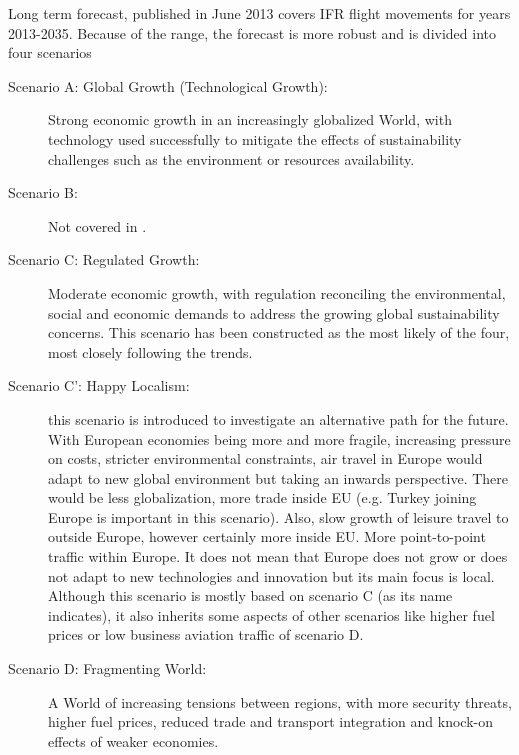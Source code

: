 Long term forecast, published in June 2013 covers IFR flight movements for years 2013-2035. Because of the range, the forecast is more robust and is divided into four scenarios \citep{growth_2013}

\begin{description}
\item[Scenario A: Global Growth (Technological Growth):] Strong economic growth in an increasingly globalized World, with technology used successfully to mitigate the effects of sustainability challenges such as the environment or resources availability.
\item[Scenario B:] Not covered in \citep{growth_2013}.
\item[Scenario C: Regulated Growth:] Moderate economic growth, with regulation reconciling the environmental, social and economic demands to address the growing global sustainability concerns. This scenario has been constructed as the most likely of the four, most closely following the trends.
\item[Scenario C’: Happy Localism:] this scenario is introduced to investigate an alternative path for the future. With European economies being more and more fragile, increasing pressure on costs, stricter environmental constraints, air travel in Europe would adapt to new global environment but taking an inwards perspective. There would be less globalization, more trade inside EU (e.g. Turkey joining Europe is important in this scenario). Also, slow growth of leisure travel to outside Europe, however certainly more inside EU. More point-to-point traffic within Europe. It does not mean that Europe does not grow or does not adapt to new technologies and innovation but its main focus is local. Although this scenario is mostly based on scenario C (as its name indicates), it also inherits some aspects of other scenarios like higher fuel prices or low business aviation traffic of scenario D.
\item[Scenario D: Fragmenting World:] A World of increasing tensions between regions, with more security threats, higher fuel prices, reduced trade and transport integration and knock-on effects of weaker economies.
\end{description}

%


